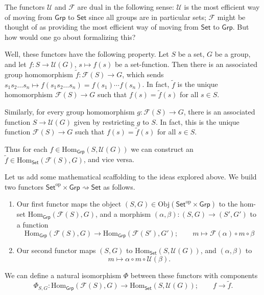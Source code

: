 \documentclass[a4paper]{report}
\newcommand{\Obj}{\mathrm{Obj}}
\newcommand{\Hom}{\mathrm{Hom}}
\theoremstyle{definition}
\theoremstyle{plain}
\theoremstyle{remark}
\begin{document}
The functors $\mathcal{U}$ and $\mathcal{F}$ are dual in the following sense: $\mathcal{U}$ is the most efficient way of moving from $\mathsf{Grp}$ to $\mathsf{Set}$ since all groups are in particular sets; $\mathcal{F}$ might be thought of as providing the most efficient way of moving from $\mathsf{Set}$ to $\mathsf{Grp}$. But how would one go about formalizing this?

Well, these functors have the following property. Let $S$ be a set, $G$ be a group, and let $f\colon S \to \mathcal{U}(G)$, $s \mapsto f(s)$ be a set-function. Then there is an associated group homomorphism $\tilde{f}\colon \mathcal{F}(S) \to G$, which sends $s_{1}s_{2}\dots s_{n} \mapsto f(s_{1}s_{2}\dots s_{n}) = f(s_{1})\cdots f(s_{n})$. In fact, $\tilde{f}$ is the unique homomorphism $\mathcal{F}(S) \to G$ such that $f(s) = \tilde{f}(s)$ for all $s \in S$. 

Similarly, for every group homomorphism $g\colon \mathcal{F}(S) \to G$, there is an associated function $S \to \mathcal{U}(G)$ given by restricting $g$ to $S$. In fact, this is the unique function $\mathcal{F}(S) \to G$ such that $f(s) = \tilde{f}(s)$ for all $s \in S$.

Thus for each $f \in \Hom_{\mathsf{Grp}}(S, \mathcal{U}(G))$ we can construct an $\tilde{f} \in \Hom_{\mathsf{Set}}(\mathcal{F}(S), G)$, and vice versa.

Let us add some mathematical scaffolding to the ideas explored above. We build two functors $\mathsf{Set}^{\mathrm{op}} \times \mathsf{Grp} \rightsquigarrow \mathsf{Set}$ as follows.
\begin{enumerate}
  \item Our first functor maps the object $(S, G) \in \Obj(\mathsf{Set}^{\mathrm{op}} \times \mathsf{Grp})$ to the hom-set $\Hom_{\mathsf{Grp}}(\mathcal{F}(S), G)$, and a morphism $(\alpha, \beta)\colon (S,G) \to (S', G')$ to a function 
    \begin{equation*}
      \Hom_{\mathsf{Grp}}(\mathcal{F}(S), G) \to \Hom_{\mathsf{Grp}}(\mathcal{F}(S'), G');\qquad m \mapsto \mathcal{F}(\alpha) \circ m \circ \beta
    \end{equation*}

  \item Our second functor maps $(S, G)$ to $\Hom_{\mathsf{Set}}(S, \mathcal{U}(G))$, and $(\alpha, \beta)$ to 
    \begin{equation*}
      m \mapsto \alpha \circ m \circ \mathcal{U}(\beta).
    \end{equation*}
\end{enumerate}
We can define a natural isomorphism $\Phi$ between these functors with components
\begin{equation*}
  \Phi_{S, G}\colon \Hom_{\mathsf{Grp}}(\mathcal{F}(S), G) \to \Hom_{\mathsf{Set}}(S, \mathcal{U}(G));\qquad f \to \tilde{f}.
\end{equation*}
\end{document}
